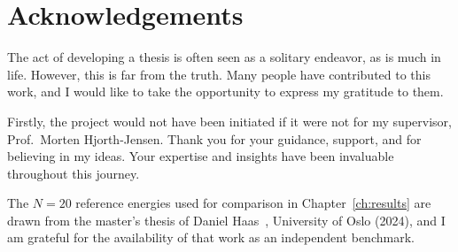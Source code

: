 \chapter*{Acknowledgements}
\thispagestyle{empty}

The act of developing a thesis is often seen as a solitary endeavor, as is much in life. However, this is far from the truth. Many people have contributed to this work, and I would like to take the opportunity to express my gratitude to them.

Firstly, the project would not have been initiated if it were not for my supervisor, Prof.\ Morten Hjorth-Jensen. Thank you for your guidance, support, and for believing in my ideas. Your expertise and insights have been invaluable throughout this journey.

The $N=20$ reference energies used for comparison in Chapter~\ref{ch:results} are drawn from the master's thesis of Daniel Haas~\cite{HaasHFQD}, University of Oslo (2024), and I am grateful for the availability of that work as an independent benchmark.

\clearpage
